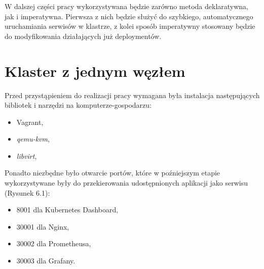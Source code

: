W dalszej części pracy wykorzystywana będzie zarówno metoda deklaratywna, jak i imperatywna. Pierwsza z nich będzie służyć do szybkiego, automatycznego uruchamiania serwisów w klastrze, z kolei sposób imperatywny stosowany będzie do modyfikowania działających już deploymentów.




\chapter{Klaster z jednym węzłem}

Przed przystąpieniem do realizacji pracy wymagana była instalacja następujących bibliotek i narzędzi na komputerze-gospodarzu:

\begin{itemize}
    \item Vagrant,
    \item \textit{qemu-kvm},
    \item \textit{libvirt},
\end{itemize}

Ponadto niezbędne było otwarcie portów, które w poźniejszym etapie wykorzystywane były do przekierowania udostępnionych aplikacji jako serwisu (Rysunek 6.1):

\begin{itemize}
    \item 8001 dla Kubernetes Dashboard,
    \item 30001 dla Nginx,
    \item 30002 dla Prometheusa,
    \item 30003 dla Grafany.
\end{itemize}

